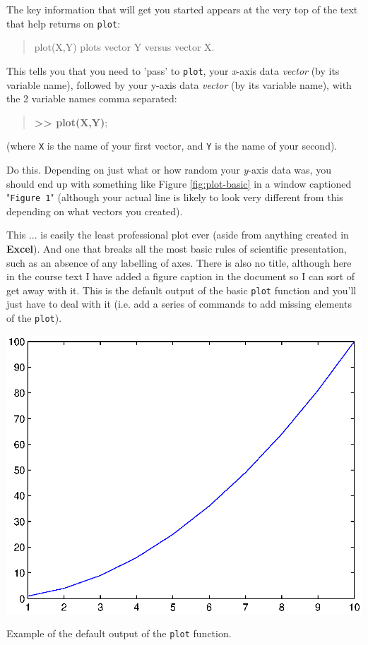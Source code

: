 \documentclass{tufte-book} %
\newenvironment{docspec}{\begin{quotation}\ttfamily\parskip0pt\parindent0pt\ignorespaces}{\end{quotation}}
\begin{document}
The key information that will get you started appears at the very top of the text that \textsf{help} returns on \texttt{plot}:

\begin{docspec}
plot(X,Y) plots vector Y versus vector X.
\end{docspec}

\noindent This tells you that you need to 'pass' to \texttt{plot}, your \textit{x}-axis data \textit{vector} (by its variable name), followed by your y-axis data \textit{vector} (by its variable name), with the 2 variable names comma separated:

\begin{docspec}
\textbf{>> plot(X,Y)};
\end{docspec}

\noindent(where \texttt{X} is the name of your first vector, and \texttt{Y} is the name of your second).

\newpage

\noindent Do this. Depending on just what or how random your \textit{y}-axis data was, you should end up with something like Figure \ref{fig:plot-basic} in a window captioned "\texttt{Figure 1}" (although your actual line is likely to look very different from this depending on what vectors you created).

This ... is easily the least professional plot ever (aside from anything created in \textbf{Excel}). And one that breaks all the most basic rules of scientific presentation, such as an absence of any labelling of axes. There is also no title, although here in the course text I have added a figure caption in the document so I can sort of get away with it. This is the default output of the basic \texttt{plot} function and you'll just have to deal with it (i.e. add a series of commands to add missing elements of the \texttt{plot}).

\begin{marginfigure}[-1.00in]
\includegraphics[width=\linewidth]{ch1-plot-basic1.eps}
\caption{Example of the default output of the \texttt{plot} function.}
\label{fig:plot-basic}
\end{marginfigure}
\end{document}
